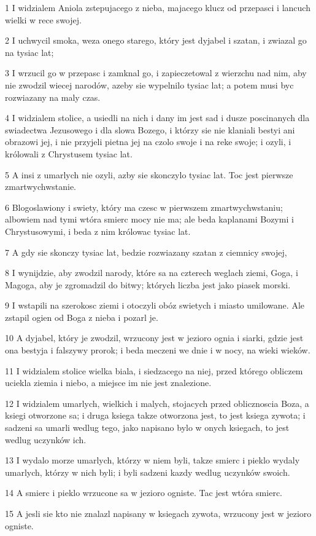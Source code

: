\par 1 I widzialem Aniola zstepujacego z nieba, majacego klucz od przepasci i lancuch wielki w rece swojej.
\par 2 I uchwycil smoka, weza onego starego, który jest dyjabel i szatan, i zwiazal go na tysiac lat;
\par 3 I wrzucil go w przepasc i zamknal go, i zapieczetowal z wierzchu nad nim, aby nie zwodzil wiecej narodów, azeby sie wypelnilo tysiac lat; a potem musi byc rozwiazany na maly czas.
\par 4 I widzialem stolice, a usiedli na nich i dany im jest sad i dusze poscinanych dla swiadectwa Jezusowego i dla slowa Bozego, i którzy sie nie klaniali bestyi ani obrazowi jej, i nie przyjeli pietna jej na czolo swoje i na reke swoje; i ozyli, i królowali z Chrystusem tysiac lat.
\par 5 A insi z umarlych nie ozyli, azby sie skonczylo tysiac lat. Toc jest pierwsze zmartwychwstanie.
\par 6 Blogoslawiony i swiety, który ma czesc w pierwszem zmartwychwstaniu; albowiem nad tymi wtóra smierc mocy nie ma; ale beda kaplanami Bozymi i Chrystusowymi, i beda z nim królowac tysiac lat.
\par 7 A gdy sie skonczy tysiac lat, bedzie rozwiazany szatan z ciemnicy swojej,
\par 8 I wynijdzie, aby zwodzil narody, które sa na czterech weglach ziemi, Goga, i Magoga, aby je zgromadzil do bitwy; których liczba jest jako piasek morski.
\par 9 I wstapili na szerokosc ziemi i otoczyli obóz swietych i miasto umilowane. Ale zstapil ogien od Boga z nieba i pozarl je.
\par 10 A dyjabel, który je zwodzil, wrzucony jest w jezioro ognia i siarki, gdzie jest ona bestyja i falszywy prorok; i beda meczeni we dnie i w nocy, na wieki wieków.
\par 11 I widzialem stolice wielka biala, i siedzacego na niej, przed którego obliczem uciekla ziemia i niebo, a miejsce im nie jest znalezione.
\par 12 I widzialem umarlych, wielkich i malych, stojacych przed oblicznoscia Boza, a ksiegi otworzone sa; i druga ksiega takze otworzona jest, to jest ksiega zywota; i sadzeni sa umarli wedlug tego, jako napisano bylo w onych ksiegach, to jest wedlug uczynków ich.
\par 13 I wydalo morze umarlych, którzy w niem byli, takze smierc i pieklo wydaly umarlych, którzy w nich byli; i byli sadzeni kazdy wedlug uczynków swoich.
\par 14 A smierc i pieklo wrzucone sa w jezioro ogniste. Tac jest wtóra smierc.
\par 15 A jesli sie kto nie znalazl napisany w ksiegach zywota, wrzucony jest w jezioro ogniste.

